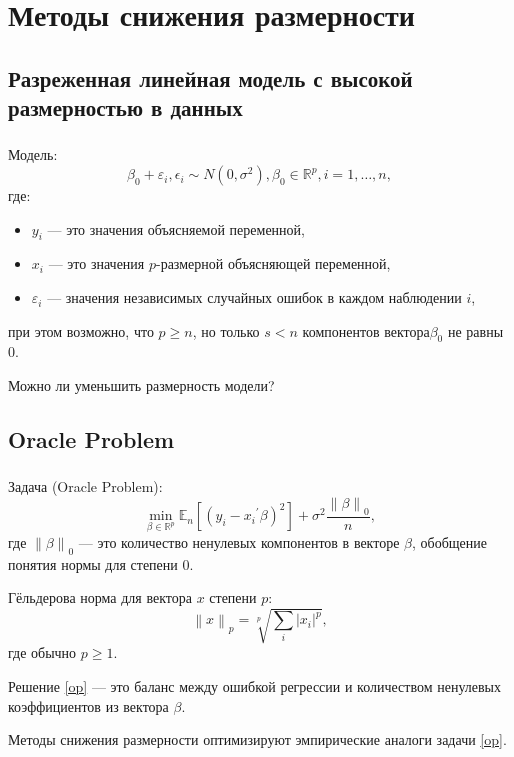 \documentclass[c, dvipsnames]{beamer}  %
\begin{document}
\section{Методы снижения размерности}
\subsection{Разреженная линейная модель с высокой размерностью в данных}

\begin{frame}
\frametitle{\insertsection} 
\framesubtitle{\insertsubsection}
Модель: 
  \begin{equation} 
\beta_0 + \varepsilon_i, \epsilon_i \sim N(0, \sigma^2), \beta_0 \in
\mathbb{R}^p, i = 1, \dots, n, 
\end{equation}
где:
  \begin{itemize}
\item $y_i$ --- это значения объясняемой
переменной, 
\item $x_i$ --- это значения $p$-размерной объясняющей переменной,
\item $\varepsilon_i$ --- значения независимых случайных ошибок в каждом наблюдении $i$, 
\end{itemize}
при этом возможно, что $p \geq n$, но только $s<n$ компонентов вектора$\beta_0$ не равны $0$.

\alert{Можно ли уменьшить размерность модели?}
\end{frame}

\subsection{Oracle Problem}
\begin{frame}[shrink=5]
\frametitle{\insertsection} 
\framesubtitle{\insertsubsection}
\begin{block}{Задача (Oracle Problem):}
\begin{equation}\label{op}
    \min_{\beta \in
\mathbb{R}^p} \mathbb{E}_n\left[ (y_i - {x_i}^{'} \beta)^2 \right] + \sigma^2
\frac{\left\lVert \beta \right\rVert_0}{n}, 
\end{equation} 
где $\left\lVert \beta \right\rVert_0$ --- это количество ненулевых компонентов в векторе $\beta$,  обобщение понятия нормы для степени $0$. 
\end{block}
\begin{block}{Гёльдерова норма для вектора $x$ степени $p$: }
\begin{equation}
    \left\lVert x \right\rVert_p = \sqrt[p]{\sum_i|x_i|^p},
\end{equation}
где обычно $p \geq 1$.

\end{block}

Решение \eqref{op} --- это  баланс между ошибкой регрессии и количеством ненулевых коэффициентов из вектора $\beta$. 

Методы снижения размерности оптимизируют эмпирические аналоги задачи \eqref{op}.
\end{frame}
\end{document}
